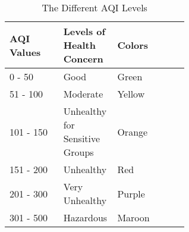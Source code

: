 
\begin{table}[H]
  \centering
  \caption{The Different AQI Levels}
  \begin{tabularx}{\linewidth}{|p{0.3\linewidth}|p{0.3\linewidth}|X|}
    \hline
    \rowcolor[HTML]{\lightblue}
    AQI Values & Levels of Health Concern & Colors
    \\\hline\hline

    \rowcolor[HTML]{00E400}
    0 - 50 & Good & Green
    \\\hline

    \rowcolor[HTML]{FFFF00}
    51 - 100 & Moderate & Yellow
    \\\hline

    \rowcolor[HTML]{FF7E00}
    101 - 150 & Unhealthy for Sensitive Groups & Orange
    \\\hline

    \rowcolor[HTML]{FF0000}
    151 - 200 & Unhealthy & Red
    \\\hline

    \rowcolor[HTML]{\purple}
    201 - 300 & Very Unhealthy & Purple
    \\\hline

    \rowcolor[HTML]{\maroon}
    301 - 500 & Hazardous & Maroon
    \\\hline

  \end{tabularx}
  \label{tab:aqi-levels}
\end{table}


